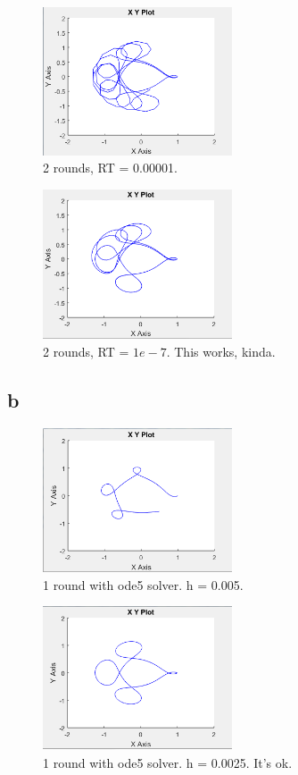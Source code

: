 \documentclass{article}
\begin{document}
\begin{figure}[!ht]
    \centering
    \includegraphics[width = 0.5\textwidth]{r3_rt_e-4}
    \caption{2 rounds, RT = 0.00001. } 
\end{figure}

\begin{figure}[!ht]
    \centering
    \includegraphics[width = 0.5\textwidth]{r3_rt_e-7}
    \caption{2 rounds, RT = $1e-7$. This works, kinda.}
\end{figure}

\subsection{b}

\begin{figure}[!ht]
    \centering
    \includegraphics[width = 0.5\textwidth]{step_005}
    \caption{1 round with ode5 solver. h = 0.005.}
\end{figure}

\begin{figure}[!ht]
    \centering
    \includegraphics[width = 0.5\textwidth]{step_0025}
    \caption{1 round with ode5 solver. h = 0.0025. It's ok.}
\end{figure}
\end{document}
